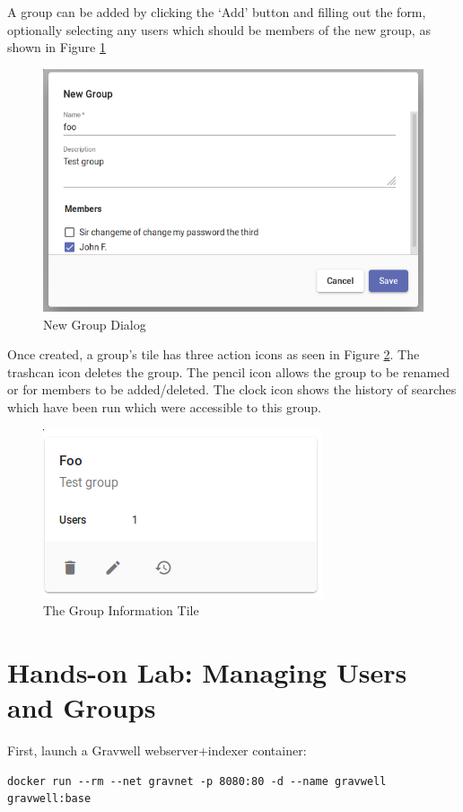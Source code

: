 A group can be added by clicking the `Add' button and filling out the
form, optionally selecting any users which should be members of the new
group, as shown in Figure \ref{fig:newgroup}

\begin{figure}
	\includegraphics[width=0.6\linewidth]{images/newgroup.png}
	\caption{New Group Dialog}
	\label{fig:newgroup}
\end{figure}

Once created, a group's tile has three action icons as seen in Figure \ref{fig:grouptile}.
The trashcan icon deletes the group. The pencil icon allows the group
to be renamed or for members to be added/deleted. The clock icon shows
the history of searches which have been run which were accessible to
this group.

\begin{figure}
	\includegraphics[width=0.5\linewidth]{images/grouptile.png}
	\caption{The Group Information Tile}
	\label{fig:grouptile}
\end{figure}

\section{Hands-on Lab: Managing Users and Groups}

First, launch a Gravwell webserver+indexer container:

\begin{Verbatim}[breaklines=true]
docker run --rm --net gravnet -p 8080:80 -d --name gravwell gravwell:base
\end{Verbatim}

